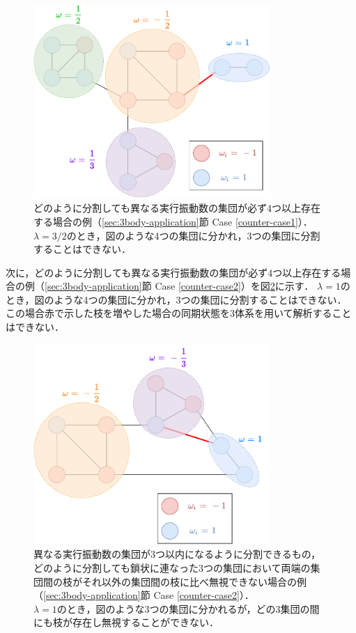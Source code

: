 \documentclass[../main]{subfiles}
\begin{document}
\begin{figure}[tbp]
    \centering
    \includegraphics[width=90mm]{./images/three-body-counter1.pdf}
    \centering
    \caption{どのように分割しても異なる実行振動数の集団が必ず4つ以上存在する場合の例（\ref{sec:3body-application}節 Case \ref{counter-case1}）．\\
    $\lambda=3/2$のとき，図のような4つの集団に分かれ，3つの集団に分割することはできない．}
    \label{fig:3body-counter1}
\end{figure}

次に，どのように分割しても異なる実行振動数の集団が必ず4つ以上存在する場合の例（\ref{sec:3body-application}節 Case \ref{counter-case2}）を図\ref{fig:3body-counter2}に示す．
$\lambda=1$のとき，図のような4つの集団に分かれ，3つの集団に分割することはできない．
この場合赤で示した枝を増やした場合の同期状態を3体系を用いて解析することはできない．

\begin{figure}[tbp]
    \centering
    \includegraphics[width=90mm]{./images/three-body-counter2.pdf}
    \centering
    \caption{異なる実行振動数の集団が3つ以内になるように分割できるもの，どのように分割しても鎖状に連なった3つの集団において両端の集団間の枝がそれ以外の集団間の枝に比べ無視できない場合の例（\ref{sec:3body-application}節 Case \ref{counter-case2}）．\\
    $\lambda=1$のとき，図のような3つの集団に分かれるが，どの3集団の間にも枝が存在し無視することができない．}
    \label{fig:3body-counter2}
\end{figure}
\end{document}
